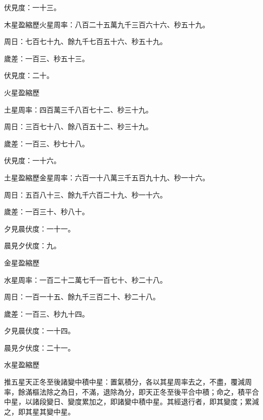 \begin{pinyinscope}
 伏見度：一十三。



 木星盈縮歷火星周率：八百二十五萬九千三百六十六、秒五十九。



 周日：七百七十九、餘九千七百五十六、秒五十九。



 歲差：一百三、秒五十三。



 伏見度：二十。



 火星盈縮歷



 土星周率：四百萬三千八百七十二、秒三十九。



 周日：三百七十八、餘八百五十二、秒三十九。



 歲差：一百三、秒七十八。



 伏見度：一十六。



 土星盈縮歷金星周率：六百一十八萬三千五百九十九、秒一十六。



 周日：五百八十三、餘九千六百二十九、秒一十六。



 歲差：一百三十、秒八十。



 夕見晨伏度：一十一。



 晨見夕伏度：九。



 金星盈縮歷



 水星周率：一百二十二萬七千一百七十、秒二十八。



 周日：一百一十五、餘九千三百二十、秒二十八。



 歲差：一百三、秒九十四。



 夕見晨伏度：一十四。



 晨見夕伏度：二十一。



 水星盈縮歷



 推五星天正冬至後諸變中積中星：置氣積分，各以其星周率去之，不盡，覆減周率，餘滿樞法除之為日，不滿，退除為分，即天正冬至後平合中積；命之，積平合中星，以諸段變日、變度累加之，即諸變中積中星。其經退行者，即其變度；累減之，即其星其變中星。




\end{pinyinscope}
